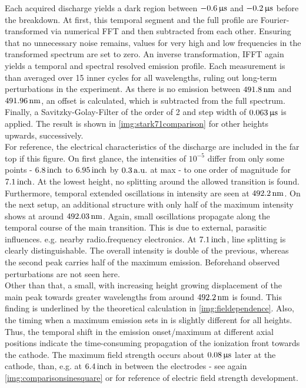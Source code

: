 \documentclass[a4paper,10pt,twoside]{article}
\newcommand{\tenpo}[1]{ 10^{#1}}
\begin{document}
		Each acquired discharge yields a dark region between $\unit[-0.6]{\upmu s}$ and $\unit[-0.2]{\upmu s}$ before the breakdown. At first, this temporal segment and the full profile are Fourier-transformed via numerical FFT and then subtracted from each other. Ensuring that no unnecessary noise remains, values for very high and low frequencies in the transformed spectrum are set to zero. An inverse transformation, IFFT again yields a temporal and spectral resolved emission profile. Each measurement is than averaged over 15 inner cycles for all wavelengths, ruling out long-term perturbations in the experiment. As there is no emission between $\unit[491.8]{nm}$ and $\unit[491.96]{nm}$, an offset is calculated, which is subtracted from the full spectrum. Finally, a Savitzky-Golay-Filter of the order of 2 and step width of $\unit[0.063]{\upmu s}$ is applied. The result is shown in \autoref{img:stark71comparison} for other heights upwards, successively.\\
		For reference, the electrical characteristics of the discharge are included in the far top if this figure.  On first glance, the intensities of $\tenpo{-5}$ differ from only some points - $\unit[6.8]{inch}$ to $\unit[6.95]{inch}$ by $\unit[0.3]{a.u.}$ at max - to one order of magnitude for $\unit[7.1]{inch}$. At the lowest height, no splitting around the allowed transition is found. Furthermore, temporal extended oscillations in intensity are seen at $\unit[492.2]{nm}$. On the next setup, an additional structure with only half of the maximum intensity shows at around $\unit[492.03]{nm}$. Again, small oscillations propagate along the temporal course of the main transition. This is due to external, parasitic influences. e.g. nearby radio.frequency electronics. At $\unit[7.1]{inch}$, line splitting is clearly distinguishable. The overall intensity is double of the previous, whereas the second peak carries half of the maximum emission. Beforehand observed perturbations are not seen here.\\			
		Other than that, a small, with increasing height growing displacement of the main peak towards greater wavelengths from around $\unit[492.2]{nm}$ is found. This finding is underlined by the theoretical calculation in \autoref{img:fieldependence}. Also, the timing when a maximum emission sets in is slightly different for all heights. Thus, the temporal shift in the emission onset/maximum at different axial positions indicate the time-consuming propagation of the ionization front towards the cathode. The maximum field strength occurs about $\unit[0.08]{\upmu s}$ later at the cathode, than, e.g. at $\unit[6.4]{inch}$ in between the electrodes - see again \autoref{img:comparisonsinesquare} or \cite{elecfielddevelop} for reference of electric field strength development.\\
\end{document}
